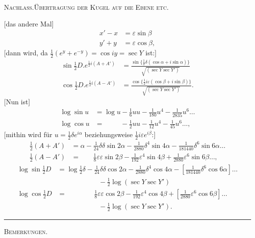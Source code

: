 \begingroup
\clearpage
{}\hfill{\small\textsc{Nachlass.\quad Übertragung der Kugel auf die Ebene etc.}}\hfill\mbox{}\par\medskip
\begingroup\small
[das andere Mal]
\[
\begin{aligned}
x'-x&=\varepsilon\sin\beta\\
y'+y&=\varepsilon\cos\beta,
\end{aligned}
\]
[dann wird, da $\tfrac12(e^y+e^{-y})=\cos iy=\sec Y$ ist:]
\[
\begin{aligned}
\sin\tfrac12D.e^{\frac12i(A+A')}&=\frac{\sin\{\frac12\delta(\cos\alpha+i\sin\alpha)\}}{\sqrt{(\sec Y\sec Y')}}\\[5pt]
\cos\tfrac12D.e^{\frac12i(A-A')}&=\frac{\cos\{\frac12i\varepsilon(\cos\beta+i\sin\beta)\}}{\sqrt{(\sec Y\sec Y')}}.
\end{aligned}
\]
[Nun ist]
\[
\begin{aligned}
\log\sin u&=\log u-\tfrac16uu-\tfrac1{180}u^4-\tfrac1{2835}u^6\ldots\\
\log\cos u&=\phantom{\log u}-\tfrac12uu-\tfrac1{12}u^4-\tfrac1{45}u^6\ldots,
\end{aligned}
\]
[mithin wird für $u=\tfrac12\delta e^{i\alpha}$ beziehungsweise $\tfrac12i\varepsilon e^{i\beta}$:]
\[
\begin{aligned}
\tfrac12(A+A')&=\alpha-\tfrac1{24}\delta\delta\sin2\alpha-\tfrac1{2880}\delta^4\sin4\alpha-\tfrac1{181440}\delta^6\sin6\alpha\ldots\\
\tfrac12(A-A')&=\phantom{\alpha-}\tfrac18\varepsilon\varepsilon\sin2\beta-\tfrac1{192}\varepsilon^4\sin4\beta+\tfrac1{2880}\varepsilon^6\sin6\beta\ldots,
\end{aligned}
\]
\[
\begin{aligned}
\log\sin\tfrac12D&=\log\tfrac12\delta-\tfrac1{24}\delta\delta\cos2\alpha-\tfrac1{2880}\delta^4\cos4\alpha-[\tfrac1{181440}\delta^6\cos6\alpha]\ldots\\
&\hspace{6em}-\tfrac12\log(\sec Y\sec Y')\\
\log\cos\tfrac12D&=\hspace{4em}\tfrac18\varepsilon\varepsilon\cos2\beta-\tfrac1{192}\varepsilon^4\cos4\beta+[\tfrac1{2880}\varepsilon^6\cos6\beta]\ldots\\
&\hspace{6em}-\tfrac12\log(\sec Y\sec Y').
\end{aligned}
\]
\begin{center}\rule{.18\textwidth}{.4pt}\par\medskip\textsc{Bemerkungen.}\end{center}
